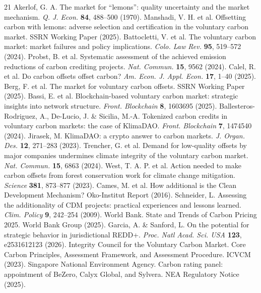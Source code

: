 \documentclass[12pt,a4paper]{article}
\begin{document}
\begin{thebibliography}{21}
 Akerlof, G. A. The market for ``lemons'': quality uncertainty and the market mechanism. \textit{Q. J. Econ.} \textbf{84}, 488--500 (1970).
 Manshadi, V. H. et al. Offsetting carbon with lemons: adverse selection and certification in the voluntary carbon market. SSRN Working Paper (2025).
 Battocletti, V. et al. The voluntary carbon market: market failures and policy implications. \textit{Colo. Law Rev.} \textbf{95}, 519--572 (2024).
 Probst, B. et al. Systematic assessment of the achieved emission reductions of carbon crediting projects. \textit{Nat. Commun.} \textbf{15}, 9562 (2024).
 Calel, R. et al. Do carbon offsets offset carbon? \textit{Am. Econ. J. Appl. Econ.} \textbf{17}, 1--40 (2025).
 Berg, F. et al. The market for voluntary carbon offsets. SSRN Working Paper (2025).
 Bassi, E. et al. Blockchain-based voluntary carbon market: strategic insights into network structure. \textit{Front. Blockchain} \textbf{8}, 1603695 (2025).
 Ballesteros-Rodriguez, A., De-Lucio, J. \& Sicilia, M.-A. Tokenized carbon credits in voluntary carbon markets: the case of KlimaDAO. \textit{Front. Blockchain} \textbf{7}, 1474540 (2024).
 Jirasek, M. KlimaDAO: a crypto answer to carbon markets. \textit{J. Organ. Des.} \textbf{12}, 271--283 (2023).
 Trencher, G. et al. Demand for low-quality offsets by major companies undermines climate integrity of the voluntary carbon market. \textit{Nat. Commun.} \textbf{15}, 6863 (2024).
 West, T. A. P. et al. Action needed to make carbon offsets from forest conservation work for climate change mitigation. \textit{Science} \textbf{381}, 873--877 (2023).
 Cames, M. et al. How additional is the Clean Development Mechanism? Oko-Institut Report (2016).
 Schneider, L. Assessing the additionality of CDM projects: practical experiences and lessons learned. \textit{Clim. Policy} \textbf{9}, 242--254 (2009).
 World Bank. State and Trends of Carbon Pricing 2025. World Bank Group (2025).
 Garcia, A. \& Sanford, L. On the potential for strategic behavior in jurisdictional REDD+. \textit{Proc. Natl Acad. Sci. USA} \textbf{123}, e2531612123 (2026).
 Integrity Council for the Voluntary Carbon Market. Core Carbon Principles, Assessment Framework, and Assessment Procedure. ICVCM (2023).
 Singapore National Environment Agency. Carbon rating panel: appointment of BeZero, Calyx Global, and Sylvera. NEA Regulatory Notice (2025).

\end{thebibliography}
\end{document}
